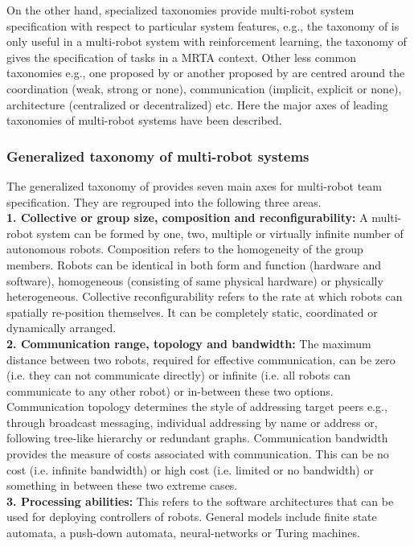On the other hand, specialized taxonomies provide multi-robot system specification with respect to particular system features, e.g., the taxonomy of  is only useful in a multi-robot system with reinforcement learning, the taxonomy of  gives the specification of tasks in a MRTA context. Other less common taxonomies e.g., one proposed by  or another proposed by  are centred around the coordination (weak, strong or none), communication (implicit, explicit or none), architecture (centralized or decentralized) etc. Here the major axes of leading taxonomies of multi-robot systems have been described.
\subsubsection*{Generalized taxonomy of multi-robot systems}
The generalized taxonomy of  provides seven main axes for multi-robot team specification.  They are  regrouped into the following three areas.\\
\textbf{1. Collective or group size, composition and reconfigurability: }  A multi-robot system can be formed by one, two, multiple or virtually infinite number of autonomous robots. Composition refers to the homogeneity of the group members. Robots can be identical in both form and function (hardware and software), homogeneous (consisting of same physical hardware) or physically heterogeneous. Collective reconfigurability refers to the rate at which robots can spatially re-position themselves. It can be completely static, coordinated or dynamically arranged.\\
\textbf{2. Communication range, topology and bandwidth: } The maximum distance between two robots, required for effective communication, can be zero (i.e. they can not communicate directly) or infinite (i.e. all robots can communicate to any other robot) or in-between these two options. Communication topology determines the style of addressing target peers e.g., through broadcast messaging, individual addressing by name or address or, following tree-like hierarchy or redundant graphs. Communication bandwidth provides the measure of costs associated with communication. This can be no cost (i.e. infinite bandwidth) or high cost (i.e. limited or no bandwidth) or something in between these two extreme cases.\\
\textbf{3. Processing abilities: } This refers to the software architectures that can be used for deploying controllers of robots. General models include finite state automata, a push-down automata, neural-networks or Turing machines. 
